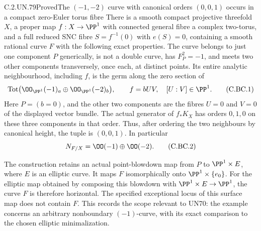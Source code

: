 \begin{statement}{C.2.UN.79}{Proved}{The \((-1,-2)\) curve with canonical orders \((0,0,1)\) occurs in a compact zero-Euler torus fibre}
There is a smooth compact projective threefold \(X\), a proper map
\(f:X\to\PP^1\) with connected general fibre a complex two-torus,
and a full reduced SNC fibre \(S=f^{-1}(0)\) with \(e(S)=0\),
containing a smooth rational curve \(F\) with the following exact
properties. The curve belongs to just one component \(P\) generically,
is not a double curve, has \(F_P^2=-1\), and meets two other
components transversely, once each, at distinct points. Its entire
analytic neighbourhood, including \(f\), is the germ along the zero
section of
\[
 \operatorname{Tot}\bigl(\OO_{\PP^1}(-1)_a
                 \oplus\OO_{\PP^1}(-2)_b\bigr),\qquad
 f=bUV,\quad [U:V]\in\PP^1.                         \tag{C.BC.1}
\]
Here \(P=(b=0)\), and the other two components are the fibres
\(U=0\) and \(V=0\) of the displayed vector bundle.
The actual generator of \(f_*K_X\) has orders \(0,1,0\)
on these three components in that order. Thus, after ordering the
two neighbours by canonical height, the tuple is \((0,0,1)\).
In particular
\[
                    N_{F/X}=\OO(-1)\oplus\OO(-2).            \tag{C.BC.2}
\]

The construction retains an actual point-blowdown map from \(P\)
to \(\PP^1\times E\), where \(E\) is an elliptic curve.
It maps \(F\) isomorphically onto \(\PP^1\times\{e_0\}\).
For the elliptic map obtained by composing this blowdown with
\(\PP^1\times E\to\PP^1\), the curve \(F\) is therefore
horizontal. The specified exceptional locus of this surface map
does not contain \(F\). This records the scope relevant to UN70:
the example concerns an arbitrary nonboundary \((-1)\)-curve,
with its exact comparison to the chosen elliptic minimalization.
\end{statement}

